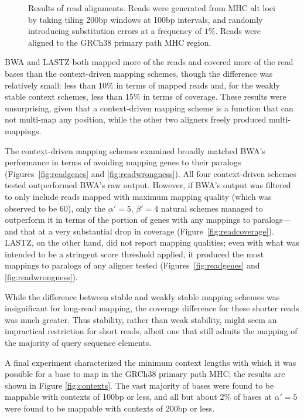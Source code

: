 \begin{figure}[t]
{  }
  \caption{Results of read alignments. Reads were generated from MHC alt loci by taking tiling 200bp windows at 100bp intervals, and randomly introducing substitution errors at a frequency of $1\%$. Reads were aligned to the GRCh38 primary path MHC region.}
  \label{fig:read}
\end{figure}

BWA and LASTZ both mapped more of the reads and covered more of the read bases than the context-driven mapping schemes, though the difference was relatively small: less than 10\% in terms of mapped reads and, for the weakly stable context schemes, less than 15\% in terms of coverage. These results were unsurprising, given that a context-driven mapping scheme is a function that can not multi-map any position, while the other two aligners freely produced multi-mappings.

The context-driven mapping schemes examined broadly matched BWA's performance in terms of avoiding mapping genes to their paralogs (Figures~\ref{fig:readgenes} and \ref{fig:readwrongness}). All four context-driven schemes tested outperformed BWA's raw output. However, if BWA's output was filtered to only include reads mapped with maximum mapping quality (which was observed to be 60), only the $\alpha'=5$, $\beta'=4$ natural schemes managed to outperform it in terms of the portion of genes with any mappings to paralogs---and that at a very substantial drop in coverage (Figure~\ref{fig:readcoverage}). LASTZ, on the other hand, did not report mapping qualities; even with what was intended to be a stringent score threshold applied, it produced the most mappings to paralogs of any aligner tested (Figures~\ref{fig:readgenes} and \ref{fig:readwrongness}). 

While the difference between stable and weakly stable mapping schemes was insignificant for long-read mapping, the coverage difference for these shorter reads was much greater. Thus stability, rather than weak stability, might seem an impractical restriction for short reads, albeit one that still admits the mapping of the majority of query sequence elements.

A final experiment characterized the minimum context lengths with which it was possible for a base to map in the GRCh38 primary path MHC; the results are shown in Figure \ref{fig:contexts}. The vast majority of bases were found to be mappable with contexts of 100bp or less, and all but about $2\%$ of bases at $\alpha' = 5$ were found to be mappable with contexts of 200bp or less.


